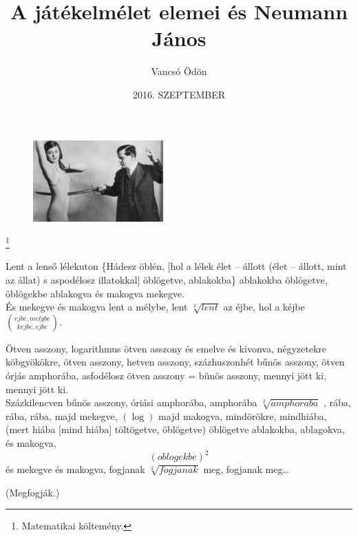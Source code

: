 \documentclass  [12pt]{article}
\begin{document}
 \author{Vancsó Ödön}

\date{2016. SZEPTEMBER}
\title{A játékelmélet elemei és Neumann János}


\cite[1]{Dana Idák}



\pagebreak



\begin{figure}
\begin{center}
\includegraphics[angle=5, width=5cm]{igy_irtok_ti.jpeg}
\end{center}
\end{figure}


\footnote{Matematikai költemény.}

Lent a lenső lélekuton \{Hádesz öblén, [hol a lélek élet – állott (élet – állott, mint az állat) s aspodélosz illatokkal] öblögetve, ablakokba\} ablakokba öblögetve, öblögekbe ablakogva és makogva mekegve.\\


És mekegve és makogva lent a mélybe, lent $ \sqrt[2]{lent}  $ az éjbe, hol a kéjbe $ {ejbe,melybe \choose   kejbe,ejbe} $.

Ötven asszony, logarithmus ötven asszony és emelve és kivonva, négyzetekre köbgyökökre, ötven asszony, hetven asszony, százhuszonhét bűnös asszony, ötven órjás amphorába, asfodélosz ötven asszony = bünös asszony, mennyi jött ki, mennyi jött ki.\\
Százkilencven bűnös asszony, óriási amphorába, amphorába \begin{math} \sqrt[2]{amphoraba} \end{math} , rába, rába, rába, majd mekegve, $(\log) $ majd makogva, mindörökre, mindhiába, (mert hiába [mind hiába] töltögetve, öblögetve) öblögetve ablakokba, ablagokva, és makogva,\begin{displaymath} (oblogekbe)^{2} \end{displaymath} és mekegve és makogva, fogjanak $ \sqrt[2]{fogjanak} $ meg, fogjanak meg…\\

\begin{center}
(Megfogják.)
\end{center}
\end{document}
